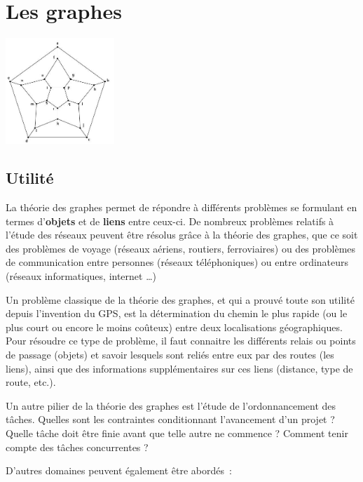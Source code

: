 \chapter{Les graphes}

\begin{center}
\includegraphics[width=4.092cm,height=3.999cm]{image/a2012Logique2eme-img041.jpg}
\end{center}
	

\section{Utilité}

	La théorie des graphes permet de répondre à différents 
	problèmes se formulant en termes d'\textbf{objets} et de
	\textbf{liens} entre ceux-ci. De nombreux problèmes relatifs 
	à l'étude des réseaux peuvent être résolus grâce à la
	théorie des graphes, que ce soit des problèmes de voyage 
	(réseaux aériens, routiers, ferroviaires) ou des problèmes de
	communication entre personnes (réseaux téléphoniques) 
	ou entre ordinateurs (réseaux informatiques, internet {\dots})

	Un problème classique de la théorie des graphes, et qui a 
	prouvé toute son utilité depuis l'invention du GPS, est la
	détermination du chemin le plus rapide (ou le plus court 
	ou encore le moins coûteux) entre deux localisations
	géographiques. Pour résoudre ce type de problème, il faut 
	connaitre les différents relais ou points de passage (objets)
	et savoir lesquels sont reliés entre eux par des routes 
	(les liens), ainsi que des informations supplémentaires sur ces
	liens (distance, type de route, etc.).

	Un autre pilier de la théorie des graphes est l'étude de 
	l'ordonnancement des tâches. Quelles sont les contraintes
	conditionnant l'avancement d'un projet ? Quelle tâche doit 
	être finie avant que telle autre ne commence ? Comment tenir
	compte des tâches concurrentes ?

	D'autres domaines peuvent également être abordés~:

